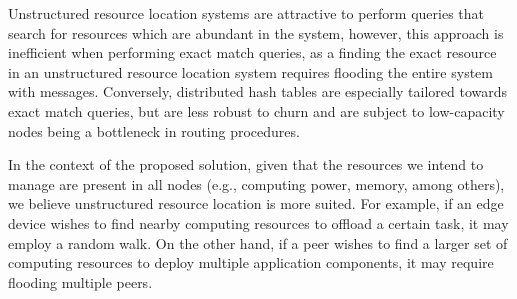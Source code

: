 Unstructured resource location systems are attractive to perform queries that search for resources which are abundant in the system, however, this approach is inefficient when performing exact match queries, as a finding the exact resource in an unstructured resource location system requires flooding the entire system with messages. Conversely, distributed hash tables are especially tailored towards exact match queries, but are less robust to churn and are subject to low-capacity nodes being a bottleneck in routing procedures. 

In the context of the proposed solution, given that the resources we intend to manage are present in all nodes (e.g., computing power, memory, among others), we believe unstructured resource location is more suited. For example, if an edge device wishes to find nearby computing resources to offload a certain task, it may employ a random walk. On the other hand, if a peer wishes to find a larger set of computing resources to deploy multiple application components, it may require flooding multiple peers. 









